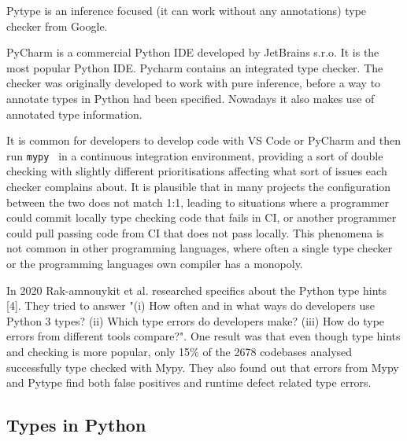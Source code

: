 Pytype is an inference focused (it can work without any annotations) type checker from Google. %


PyCharm is a commercial Python IDE developed by JetBrains s.r.o. It is the most popular Python IDE. Pycharm contains an integrated type checker. The checker was originally developed to work with pure inference, before a way to annotate types in Python had been specified. Nowadays it also makes use of annotated type information. 


It is common for developers to develop code with VS Code or PyCharm and then run {\tt mypy } in a continuous integration environment, providing a sort of double checking with slightly different prioritisations affecting what sort of issues each checker complains about. It is plausible that in many projects the configuration between the two does not match 1:1, leading to situations where a programmer could commit locally type checking code that fails in CI, or another programmer could pull passing code from CI that does not pass locally. This phenomena is not common in other programming languages, where often a single type checker or the programming languages own compiler has a monopoly.

In 2020 Rak-amnouykit et al. researched specifics about the Python type hints [4]. They tried to answer "(i) How often and in what ways do developers use Python 3 types? (ii) Which type errors do developers make? (iii) How do type errors from different tools compare?". One result was that even though type hints and checking is more popular, only 15\% of the 2678 codebases analysed successfully type checked with Mypy. They also found out that errors from Mypy and Pytype find both false positives and runtime defect related type errors.


\subsection{Types in Python}
